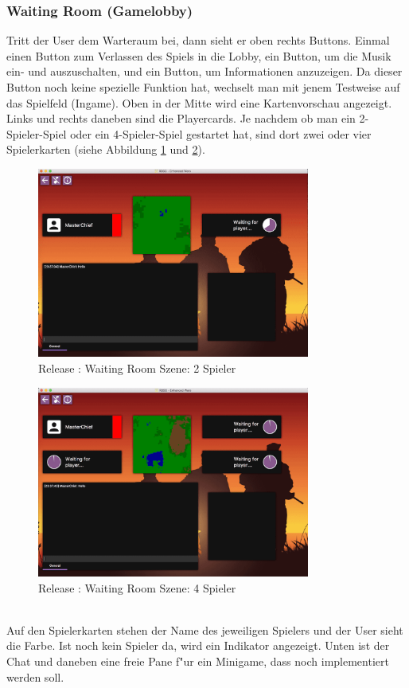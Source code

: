 \documentclass[12pt, titlepage]{scrartcl}
\newcommand{\RN}[1]{%
	\textup{\uppercase\expandafter{\romannumeral#1}}%
}
\begin{document}
	        \subsubsection{Waiting Room (Gamelobby)} \label{WAITING_ROOM}
                Tritt der User dem Warteraum bei, dann sieht er oben rechts Buttons. Einmal einen Button zum Verlassen des Spiels in die Lobby, ein Button, um die Musik ein- und auszuschalten, und ein Button, um Informationen anzuzeigen. Da dieser Button noch keine spezielle Funktion hat, wechselt man mit jenem Testweise auf das Spielfeld (Ingame). Oben in der Mitte wird eine Kartenvorschau angezeigt. Links und rechts daneben sind die Playercards. Je nachdem ob man ein 2- Spieler-Spiel oder ein 4-Spieler-Spiel gestartet hat, sind dort zwei oder vier Spielerkarten (siehe Abbildung \ref{Waiting_Room_2} und \ref{Waiting_Room_4}). \\
                \begin{figure}[H] 
    				\centering
    				\includegraphics[width=0.8\textwidth]{images/old_state/waiting_room/2Player.png}
    				\caption{Release \RN{2}: Waiting Room Szene: 2 Spieler}
    				\label{Waiting_Room_2}
			    \end{figure}
			    \begin{figure}[H] 
    				\centering
    				\includegraphics[width=0.8\textwidth]{images/old_state/waiting_room/4Player.png}
    				\caption{Release \RN{2}: Waiting Room Szene: 4 Spieler}
    				\label{Waiting_Room_4}
			    \end{figure}
			    \ \\ Auf den Spielerkarten stehen der Name des jeweiligen Spielers und der User sieht die Farbe. Ist noch kein Spieler da, wird ein Indikator angezeigt. Unten ist der Chat und daneben eine freie Pane f"ur ein Minigame, dass noch implementiert werden soll.
\end{document}
